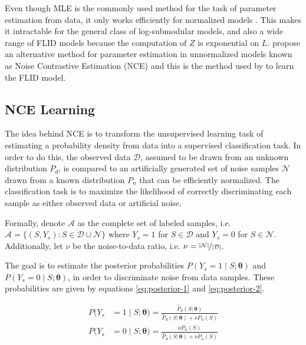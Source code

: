 Even though MLE is the commonly used method for the task of parameter estimation from data, it only works efficiently for normalized models \citep{Gutmann12NCE}. This makes it intractable for the general class of log-submodular models, and also a wide range of FLID models because the computation of $Z$ is exponential on $L$. \citet{Gutmann12NCE} propose an alternative method for parameter estimation in unnormalized models known as Noise Contrastive Estimation (NCE) and this is the method used by \citet{tschiatschek16learning} to learn the FLID model.

\subsection{NCE Learning}

The idea behind NCE is to transform the unsupervised learning task of estimating a probability density from data into a supervised classification task. In order to do this, the observed data $\mathcal{D}$, assumed to be drawn from an unknown distribution $P_{d}$, is compared to an artificially generated set of noise samples $\mathcal{N}$ drawn from a known distribution $P_{n}$ that can be efficiently normalized. The classification task is to maximize the likelihood of correctly discriminating each sample as either observed data or artificial noise.

Formally, denote $\mathcal{A}$ as the complete set of labeled samples, i.e. $\mathcal{A} = \{(S,Y_{s}) : S \in \mathcal{D} \cup \mathcal{N}\}$ where $Y_{s} = 1$ for $S \in \mathcal{D}$ and $Y_{s} = 0$ for $S \in \mathcal{N}$. Additionally, let $\nu$ be the noise-to-data ratio, i.e. $\nu = \nicefrac{|\mathcal{N}|}{|\mathcal{D}|}$.

The goal is to estimate the posterior probabilities $P(Y_{s} = 1 \mid S;\boldsymbol{\theta})$ and $P(Y_{s} = 0 \mid S;\boldsymbol{\theta})$, in order to discriminate noise from data samples. These probabilities are given by equations \eqref{eq:posterior-1} and \eqref{eq:posterior-2}.

\begin{align}
  P(Y_{s} &= 1 \mid S;\boldsymbol{\theta}) = \frac{\hat{P}_{d}(S;\boldsymbol{\theta})}{\hat{P}_{d}(S;\boldsymbol{\theta}) + \nu P_{n}(S)}
  \label{eq:posterior-1} \\
  P(Y_{s} &= 0 \mid S;\boldsymbol{\theta}) = \frac{\nu P_{n}(S)}{\hat{P}_{d}(S;\boldsymbol{\theta}) + \nu P_{n}(S)}
  \label{eq:posterior-2}
\end{align}

